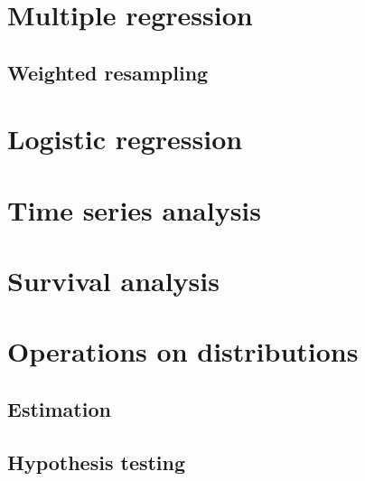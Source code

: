 \documentclass[12pt]{book}
\begin{document}
\chapter{Multiple regression}

\section{Weighted resampling}


\chapter{Logistic regression}


\chapter{Time series analysis}



\chapter{Survival analysis}


\chapter{Operations on distributions}
\label{operations}

\section{Estimation}

\section{Hypothesis testing}


\printindex

\clearemptydoublepage
\end{document}
